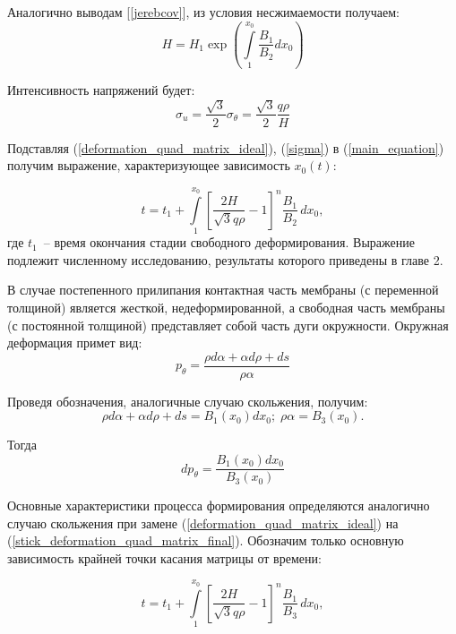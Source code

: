  Аналогично выводам [\ref{jerebcov}], из условия несжимаемости получаем:
 \begin{equation}
 H=H_1\exp\left(\int\limits_1^{x_0}\dfrac{B_1}{B_2}dx_0\right)
  \label{quad_matrix_h}
 \end{equation}
 
 Интенсивность напряжений будет:
 \begin{equation}
 \sigma_u = \dfrac{\sqrt 3}{2}\sigma_\theta = \dfrac{\sqrt 3}{2}\dfrac{q\rho}{H}
 \label{sigma}
 \end{equation}
 
 Подставляя (\ref{deformation_quad_matrix_ideal}), (\ref{sigma}) в (\ref{main_equation}) получим выражение, характеризующее зависимость $x_0(t)$:
 
 \begin{equation}
   t = t_1 + \int\limits^{x_0}_1 \left[ \dfrac{2H}{\sqrt3 q \rho} -1\right]^n\dfrac{B_1}{B_2}\,dx_0,
   \end{equation}
где $t_1$~-- время окончания стадии свободного деформирования.   
Выражение подлежит численному исследованию, результаты которого приведены в главе 2.

В случае постепенного прилипания контактная часть мембраны (с переменной толщиной)
является жесткой, недеформированной, а свободная часть мембраны (с постоянной толщиной) представляет собой часть дуги окружности.
Окружная деформация примет вид:
\begin{equation}
p_\theta = \dfrac{\rho d\alpha +\alpha d\rho+ds}{\rho\alpha}
\label{stick_deformation_quad_matrix}
\end{equation}

Проведя обозначения, аналогичные случаю скольжения, получим: 
\begin{equation}
\rho d\alpha + \alpha d\rho +ds = B_1(x_0)dx_0;\; \rho\alpha = B_3(x_0).
\end{equation}

Тогда 
\begin{equation}
	dp_\theta = \dfrac{B_1(x_0)dx_0}{B_3(x_0)}
\label{stick_deformation_quad_matrix_final}
\end{equation}

Основные характеристики процесса формирования определяются аналогично случаю скольжения при замене (\ref{deformation_quad_matrix_ideal}) 
на (\ref{stick_deformation_quad_matrix_final}). Обозначим только основную зависимость крайней точки касания матрицы от времени:

 \begin{equation}
   t = t_1 + \int\limits^{x_0}_1 \left[ \dfrac{2H}{\sqrt3 q \rho} -1\right]^n\dfrac{B_1}{B_3}\,dx_0,
   \end{equation}
